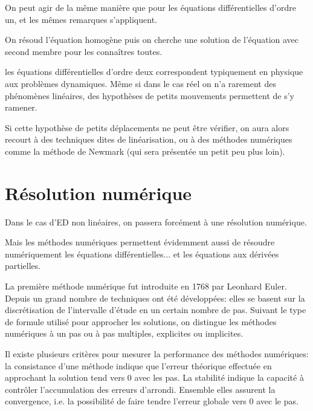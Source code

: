 On peut agir de la même manière que pour les équations différentielles d'ordre un, et les mêmes
remarques s'appliquent.

On résoud l'équation homogène puis on cherche une solution de l'équation avec second membre 
pour les connaîtres toutes.

\medskip
les équations différentielles d'ordre deux correspondent typiquement en physique aux problèmes dynamiques.
Même si dans le cas réel on n'a rarement des phénomènes linéaires, des hypothèses
de petits mouvements permettent de s'y ramener.

Si cette hypothèse de petits déplacements ne peut être vérifier, on aura
alors recourt à des techniques dites de linéarisation, ou à des méthodes
numériques comme la méthode de Newmark (qui sera présentée un petit peu
plus loin).










\bigskip
\newpage%
\section{Résolution numérique}

Dans le cas d'ED non linéaires, on passera forcément à une résolution numérique.

Mais les méthodes numériques permettent évidemment aussi de résoudre
numériquement les équations différentielles... et les équations aux dérivées partielles.

\bigskip
\begin{histoire}%
La première méthode numérique fut introduite en 1768 par Leonhard Euler. 
Depuis un grand nombre de techniques ont été développées: 
elles se basent sur la discrétisation de l'intervalle d'étude en un certain nombre de pas. 
Suivant le type de formule utilisé pour approcher les solutions, on distingue les méthodes 
numériques à un pas ou à pas multiples, explicites ou implicites.

\medskip
Il existe plusieurs critères pour mesurer la performance des méthodes numériques: 
la consistance d'une méthode indique que l'erreur théorique effectuée en approchant 
la solution tend vers 0 avec les pas. 
La stabilité indique la capacité à contrôler l'accumulation des erreurs d'arrondi. 
Ensemble elles assurent la convergence, i.e. la possibilité de faire tendre l'erreur globale 
vers 0 avec le pas.
\end{histoire}

